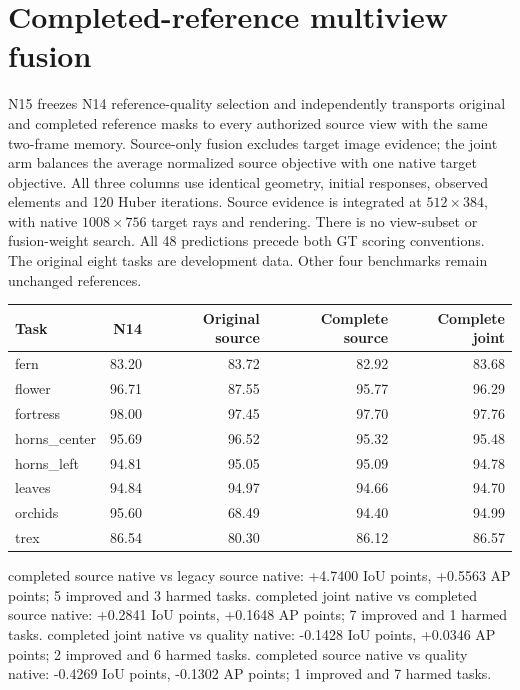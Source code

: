 \section{Completed-reference multiview fusion}
N15 freezes N14 reference-quality selection and independently transports original and completed reference masks to every authorized source view with the same two-frame memory. Source-only fusion excludes target image evidence; the joint arm balances the average normalized source objective with one native target objective. All three columns use identical geometry, initial responses, observed elements and 120 Huber iterations. Source evidence is integrated at $512\times384$, with native $1008\times756$ target rays and rendering. There is no view-subset or fusion-weight search. All 48 predictions precede both GT scoring conventions. The original eight tasks are development data. Other four benchmarks remain unchanged references.
\begin{center}\small\resizebox{\linewidth}{!}{}\end{center}
\begin{center}\small\begin{tabular}{lrrrr}\toprule
Task & N14 & Original source & Complete source & Complete joint \\\midrule
fern & 83.20 & 83.72 & 82.92 & 83.68 \\
flower & 96.71 & 87.55 & 95.77 & 96.29 \\
fortress & 98.00 & 97.45 & 97.70 & 97.76 \\
horns\_center & 95.69 & 96.52 & 95.32 & 95.48 \\
horns\_left & 94.81 & 95.05 & 95.09 & 94.78 \\
leaves & 94.84 & 94.97 & 94.66 & 94.70 \\
orchids & 95.60 & 68.49 & 94.40 & 94.99 \\
trex & 86.54 & 80.30 & 86.12 & 86.57 \\
\bottomrule\end{tabular}\end{center}
completed source native vs legacy source native: +4.7400 IoU points, +0.5563 AP points; 5 improved and 3 harmed tasks.
completed joint native vs completed source native: +0.2841 IoU points, +0.1648 AP points; 7 improved and 1 harmed tasks.
completed joint native vs quality native: -0.1428 IoU points, +0.0346 AP points; 2 improved and 6 harmed tasks.
completed source native vs quality native: -0.4269 IoU points, -0.1302 AP points; 1 improved and 7 harmed tasks.
